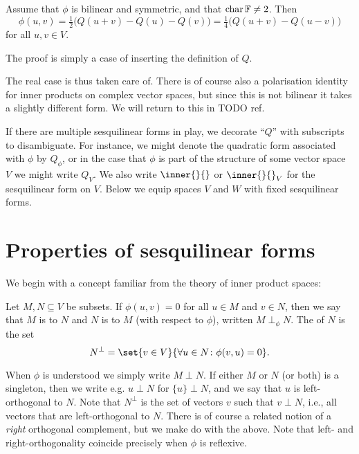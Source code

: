 \begin{propositionnoproof}[Polarisation]
    Assume that $\phi$ is bilinear and symmetric, and that $\operatorname{char} \mathbb{F} \neq 2$. Then
    \begin{equation*}
        \phi(u,v)
            = \tfrac{1}{2} \bigl( Q(u+v) - Q(u) - Q(v) \bigr)
            = \tfrac{1}{4} \bigl( Q(u+v) - Q(u-v) \bigr)
    \end{equation*}
    for all $u,v \in V$.
\end{propositionnoproof}
%
The proof is simply a case of inserting the definition of $Q$.

The real case is thus taken care of. There is of course also a polarisation identity for inner products on complex vector spaces, but since this is not bilinear it takes a slightly different form. We will return to this in TODO ref.


If there are multiple sesquilinear forms in play, we decorate \enquote{$Q$} with subscripts to disambiguate. For instance, we might denote the quadratic form associated with $\phi$ by $Q_\phi$, or in the case that $\phi$ is part of the structure of some vector space $V$ we might write $Q_V$. We also write $\inner{}{}$ or $\inner{}{}_V$ for the sesquilinear form on $V$. Below we equip spaces $V$ and $W$ with fixed sesquilinear forms.


\section{Properties of sesquilinear forms}

We begin with a concept familiar from the theory of inner product spaces:

\begin{definition}[Orthogonality]
    \label{def:orthogonality}
    Let $M,N \subseteq V$ be subsets. If $\phi(u,v) = 0$ for all $u \in M$ and $v \in N$, then we say that $M$ is  to $N$ and $N$ is  to $M$ (with respect to $\phi$), written $M \perp_\phi N$. The  of $N$ is the set
    \begin{equation*}
        N^\perp
            = \set{v \in V}{\forall u \in N \colon \phi(v,u) = 0}.
    \end{equation*}
\end{definition}
%
When $\phi$ is understood we simply write $M \perp N$. If either $M$ or $N$ (or both) is a singleton, then we write e.g. $u \perp N$ for $\{u\} \perp N$, and we say that $u$ is left-orthogonal to $N$. Note that $N^\perp$ is the set of vectors $v$ such that $v \perp N$, i.e., all vectors that are left-orthogonal to $N$. There is of course a related notion of a \emph{right} orthogonal complement, but we make do with the above. Note that left- and right-orthogonality coincide precisely when $\phi$ is reflexive.

